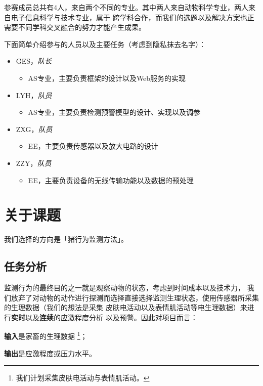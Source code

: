 \documentclass[UTF8]{ctexart}
\begin{document}
参赛成员总共有4人，来自两个不同的专业。其中两人来自动物科学专业，两人来自电子信息科学与技术专业，属于
跨学科合作，而我们的选题以及解决方案也正需要不同学科交叉融合的努力才能产生成果。
\par
下面简单介绍参与的人员以及主要任务（考虑到隐私抹去名字）：
\begin{itemize}
    \item GES，\emph{队长}
    \begin{itemize}
        \item AS专业，主要负责框架的设计以及Web服务的实现
    \end{itemize}
    \item LYH，\emph{队员}
    \begin{itemize}
        \item AS专业，主要负责检测预警模型的设计、实现以及调参
    \end{itemize}
    \item ZXG，\emph{队员}
    \begin{itemize}
        \item EE，主要负责传感器以及放大电路的设计
    \end{itemize}
    \item ZZY，\emph{队员}
    \begin{itemize}
        \item EE，主要负责设备的无线传输功能以及数据的预处理
    \end{itemize}
\end{itemize}

\newpage
\section{关于课题}

我们选择的方向是「猪行为监测方法」。

\subsection{任务分析}

监测行为的最终目的之一就是观察动物的状态，考虑到时间成本以及技术力，
我们放弃了对动物的动作进行探测而选择直接选择监测生理状态，使用传感器所采集的生理数据（我们的想法是采集
皮肤电活动以及表情肌活动等电生理数据）来进行\textbf{实时}以及\textbf{连续}的应激程度分析
以及预警。因此对项目而言：
\par
\textbf{输入}是家畜的生理数据 \footnote{我们计划采集皮肤电活动与表情肌活动。}；
\par
\textbf{输出}是应激程度或压力水平。
\end{document}
